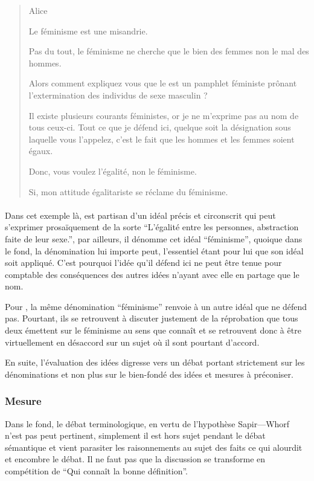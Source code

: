 \begin{quote}
  \begin{drama}{0cm}{0cm}{Alice}

    \Aspeaks Le féminisme est une misandrie.

    \Bspeaks Pas du tout, le féminisme ne cherche que le bien des femmes non le mal des hommes.

    \Aspeaks Alors comment expliquez vous que le  est un pamphlet féministe prônant l’extermination des individus de sexe masculin ?

    \Bspeaks Il existe plusieurs courants féministes, or je ne m’exprime pas au nom de tous ceux-ci. Tout ce que je défend ici, quelque soit la désignation sous laquelle vous l’appelez, c’est le fait que les hommes et les femmes soient égaux.

    \Aspeaks Donc, vous voulez l’égalité, non le féminisme.

    \Bspeaks Si, mon attitude égalitariste se réclame du féminisme.

  \end{drama}
\end{quote}

\paragraph{}
Dans cet exemple là, \B est partisan d’un idéal précis et circonscrit qui peut s’exprimer prosaïquement de la sorte \enquote{L’égalité entre les personnes, abstraction faite de leur sexe.}, par ailleurs, il dénomme cet idéal \enquote{féminisme}, quoique dans le fond, la dénomination lui importe peut, l’essentiel étant pour lui que son idéal soit appliqué.
C’est pourquoi l’idée qu’il défend ici ne peut être tenue pour comptable des conséquences des autres idées n’ayant avec elle en partage que le nom.

Pour \A, la même dénomination \enquote{féminisme} renvoie à un autre idéal que \B ne défend pas. Pourtant, ils se retrouvent à discuter justement de la réprobation que tous deux émettent sur le féminisme au sens que connaît \A et se retrouvent donc à être virtuellement en désaccord sur un sujet où il sont pourtant d’accord.

En suite, l’évaluation des idées digresse vers un débat portant strictement sur les dénominations et non plus sur le bien-fondé des idées et mesures à préconiser.


\subsubsection{Mesure}
Dans le fond, le débat terminologique, en vertu de l’hypothèse Sapir—Whorf n’est pas peut pertinent, simplement il est hors sujet pendant le débat sémantique et vient parasiter les raisonnements au sujet des faits ce qui alourdit et encombre le débat. Il ne faut pas que la discussion se transforme en compétition de \enquote{Qui connaît la bonne définition}.

